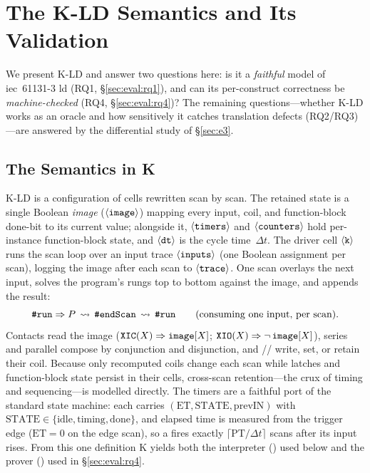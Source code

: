 \providecommand{\kld}{\textsc{K-LD}}
\providecommand{\kst}{\textsc{K-ST}}
\providecommand{\cmark}{\ensuremath{\checkmark}}

\section{The \texorpdfstring{\kld{}}{K-LD} Semantics and Its Validation}
\label{sec:semantics}

We present \kld{} and answer two questions here: is it a \emph{faithful} model of
\gls{iec}~61131-3 \gls{ld} (RQ1, \S\ref{sec:eval:rq1}), and can its
per-construct correctness be \emph{machine-checked} (RQ4, \S\ref{sec:eval:rq4})?
The remaining questions---whether \kld{} works as an oracle and how sensitively it
catches translation defects (RQ2/RQ3)---are answered by the differential study of
\S\ref{sec:e3}.

\subsection{The Semantics in \texorpdfstring{\textsf{K}}{K}}
\label{sub:sem}
\kld{} is a configuration of cells rewritten scan by scan. The retained state is a
single Boolean \emph{image} ($\langle\texttt{image}\rangle$) mapping every input,
coil, and function-block done-bit to its current value; alongside it,
$\langle\texttt{timers}\rangle$ and $\langle\texttt{counters}\rangle$ hold per-instance
function-block state, and $\langle\texttt{dt}\rangle$ is the cycle time~$\Delta t$.
The driver cell $\langle\texttt{k}\rangle$ runs the scan loop over an input trace
$\langle\texttt{inputs}\rangle$ (one Boolean assignment per scan), logging the image
after each scan to $\langle\texttt{trace}\rangle$. One scan overlays the next input,
solves the program's rungs top to bottom against the image, and appends the result:
\[
\text{\texttt{\#run}} \Rightarrow P \,\rightsquigarrow\, \text{\texttt{\#endScan}}
\,\rightsquigarrow\, \text{\texttt{\#run}}
\qquad\text{(consuming one input, per scan).}
\]
Contacts read the image ($\texttt{XIC}(X)\Rightarrow \texttt{image}[X]$;
$\texttt{XIO}(X)\Rightarrow\lnot\,\texttt{image}[X]$), series and parallel compose by
conjunction and disjunction, and // write, set, or
retain their coil. Because only recomputed coils change each scan while latches and
function-block state persist in their cells, cross-scan retention---the crux of
timing and sequencing---is modelled directly. The timers are a faithful port of the
standard state machine: each carries $(\mathrm{ET},\mathrm{STATE},\mathrm{prevIN})$
with $\mathrm{STATE}\in\{\text{idle},\text{timing},\text{done}\}$, and elapsed time
is measured from the trigger edge ($\mathrm{ET}=0$ on the edge scan), so a
 fires exactly $\lceil \mathrm{PT}/\Delta t\rceil$ scans after its input
rises. From this one definition \textsf{K} yields both the interpreter ()
used below and the prover () used in \S\ref{sec:eval:rq4}.

